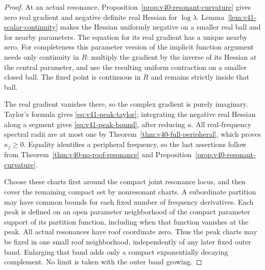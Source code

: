 \begin{proof}
At an actual resonance, Proposition~\ref{prop:v40-resonant-curvature}
gives zero real gradient and negative definite real Hessian for
$\log\lambda$. Lemma~\ref{lem:v41-scalar-continuity} makes the
Hessian uniformly negative on a smaller real ball and for nearby
parameters. The equation for its real gradient has a unique nearby
zero. For completeness this parameter version of the implicit function
argument needs only continuity in $R$: multiply the gradient by the
inverse of its Hessian at the central parameter, and use the resulting
uniform contraction on a smaller closed ball. The fixed point is
continuous in $R$ and remains strictly inside that ball.

The real gradient vanishes there, so the complex gradient is purely
imaginary. Taylor's formula gives \eqref{eq:v41-peak-taylor}; integrating
the negative real Hessian along a segment gives
\eqref{eq:v41-peak-bound}, after reducing $a$. All real-frequency
spectral radii are at most one by Theorem~\ref{thm:v40-full-peripheral},
which proves $\kappa_j\ge0$. Equality identifies a peripheral frequency,
so the last assertions follow from
Theorem~\ref{thm:v40-no-roof-resonance} and
Proposition~\ref{prop:v40-resonant-curvature}.

Choose these charts first around the compact joint resonance locus,
and then cover the remaining compact set by nonresonant charts.
A subordinate partition may have common bounds for each fixed number
of frequency derivatives. Each peak is defined on an open parameter
neighborhood of the compact parameter support of its partition
function, including when that function vanishes at the peak. All actual
resonances have roof coordinate zero. Thus the peak charts may be fixed
in one small roof neighborhood, independently of any later fixed outer
band. Enlarging that band adds only a compact exponentially decaying
complement. No limit is taken with the outer band growing.
\end{proof}

